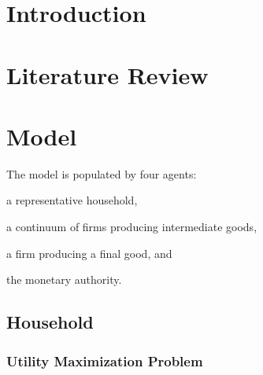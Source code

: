\documentclass[
	12pt, 
	]{article}
\numberwithin{equation}{section}
\theoremstyle{definition}
\theoremstyle{plain}
\theoremstyle{plain}
\theoremstyle{plain}
\begin{document}
\section{Introduction}\label{sec:introduction}

\lipsum[1]



\section{Literature Review}\label{sec:literature-review}

\lipsum[1]

\newpage


\section{Model}\label{sec:model}


The model is populated by four agents: 
\begin{enumerate*}[label=(\arabic*)]
	\item a representative household,
	\item a continuum of firms producing intermediate goods,
	\item a firm producing a final good, and
	\item the monetary authority.
\end{enumerate*}


\subsection{Household}

\subsubsection*{Utility Maximization Problem}
\end{document}
